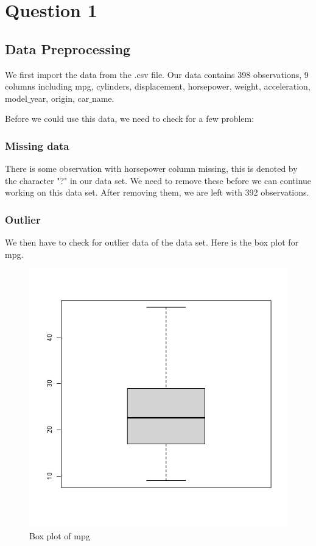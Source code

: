\section{Question 1}

\subsection{Data Preprocessing}

We first import the data from the .csv file. Our data contains 398 observations, 9 columns including mpg, cylinders, displacement, horsepower, weight, acceleration, model$\_$year, origin, car$\_$name. 

Before we could use this data, we need to check for a few problem:

\subsubsection{Missing data}

There is some observation with horsepower column missing, this is denoted by the character "?" in our data set. We need to remove these before we can continue working on this data set. After removing them, we are left with 392 observations.

\subsubsection{Outlier}

We then have to check for outlier data of the data set. Here is the box plot for mpg.

\begin{figure}[H]
\centering
\includegraphics[scale=0.4]{img/mgpboxplot.png}
\caption{Box plot of mpg}
\label{fig:box_plot_mpg}
\end{figure}

